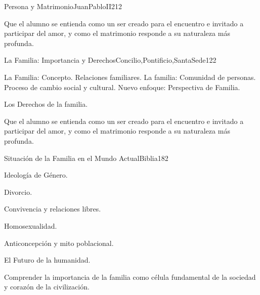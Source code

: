 \begin{syllabus}
\begin{unit}{Persona y Matrimonio}{JuanPabloII}{21}{2}
\begin{learningoutcomes}
	\item Que el alumno se entienda como un ser creado para el encuentro e invitado a participar del amor, y como el matrimonio responde a su naturaleza más profunda.  
\end{learningoutcomes}
\end{unit}

\begin{unit}{La Familia: Importancia y Derechos}{Concilio,Pontificio,SantaSede}{12}{2}
\begin{topics}
	\item La Familia: Concepto. Relaciones familiares. La familia: Comunidad de personas. Proceso de cambio social y cultural. Nuevo enfoque: Perspectiva de Familia.
	\item Los Derechos de la familia.	
\end{topics}

\begin{learningoutcomes}
	\item Que el alumno se entienda como un ser creado para el encuentro e invitado a participar del amor, y como el matrimonio responde a su naturaleza más profunda.  
\end{learningoutcomes}
\end{unit}

\begin{unit}{Situación de la Familia en el Mundo Actual}{Biblia}{18}{2}
\begin{topics}
	\item Ideología de Género.
	\item Divorcio.
	\item Convivencia y relaciones libres.
	\item Homosexualidad.
	\item Anticoncepción y mito poblacional.
	\item El Futuro de la humanidad.

\end{topics}

\begin{learningoutcomes}
	\item Comprender la importancia de la familia como célula fundamental de la sociedad y corazón de la civilización.
\end{learningoutcomes}
\end{unit}



\begin{coursebibliography}
\end{coursebibliography}

\end{syllabus}
